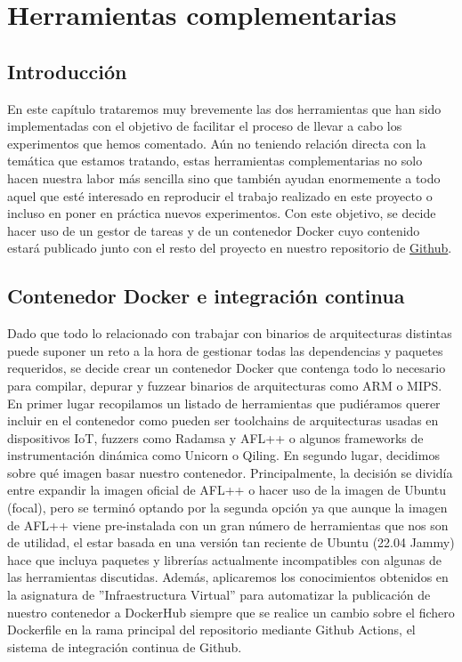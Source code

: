 \chapter{Herramientas complementarias}
\section{Introducción}
En este capítulo trataremos muy brevemente las dos herramientas que han sido implementadas con el objetivo de facilitar el proceso de llevar a cabo los 
experimentos que hemos comentado. Aún no teniendo relación directa con la temática que estamos tratando, estas herramientas complementarias no solo 
hacen nuestra labor más sencilla sino que también ayudan enormemente a todo aquel que esté interesado en reproducir el trabajo realizado en este proyecto
o incluso en poner en práctica nuevos experimentos. Con este objetivo, se decide hacer uso de un gestor de tareas y de un contenedor Docker cuyo contenido estará
publicado junto con el resto del proyecto en nuestro repositorio de \href{https://github.com/Olasergiolas/TFG}{Github}.

\section{Contenedor Docker e integración continua}
Dado que todo lo relacionado con trabajar con binarios de arquitecturas distintas puede suponer un reto a la hora de gestionar todas las dependencias
y paquetes requeridos, se decide crear un contenedor Docker que contenga todo lo necesario para compilar, depurar y fuzzear binarios de arquitecturas como 
ARM o MIPS. En primer lugar recopilamos un listado de herramientas que pudiéramos querer incluir en el contenedor como pueden ser toolchains de arquitecturas
usadas en dispositivos IoT, 
fuzzers como Radamsa y AFL++ o algunos frameworks de instrumentación dinámica como Unicorn o Qiling. En segundo lugar, decidimos sobre qué
imagen basar nuestro contenedor. Principalmente, la decisión se dividía entre expandir la imagen oficial de AFL++ o hacer uso de la imagen de Ubuntu (focal), pero se 
terminó optando por la segunda opción ya que aunque la imagen de AFL++ viene pre-instalada con un gran número de herramientas que nos son de utilidad, el 
estar basada en una versión tan reciente de Ubuntu (22.04 Jammy) hace que incluya paquetes y librerías actualmente incompatibles con algunas de las 
herramientas discutidas. Además, aplicaremos los conocimientos obtenidos en la asignatura de ''Infraestructura Virtual'' para automatizar la publicación de nuestro
contenedor a DockerHub siempre que se realice un cambio sobre el fichero Dockerfile en la rama principal del repositorio mediante Github Actions,
el sistema de integración continua de Github.

